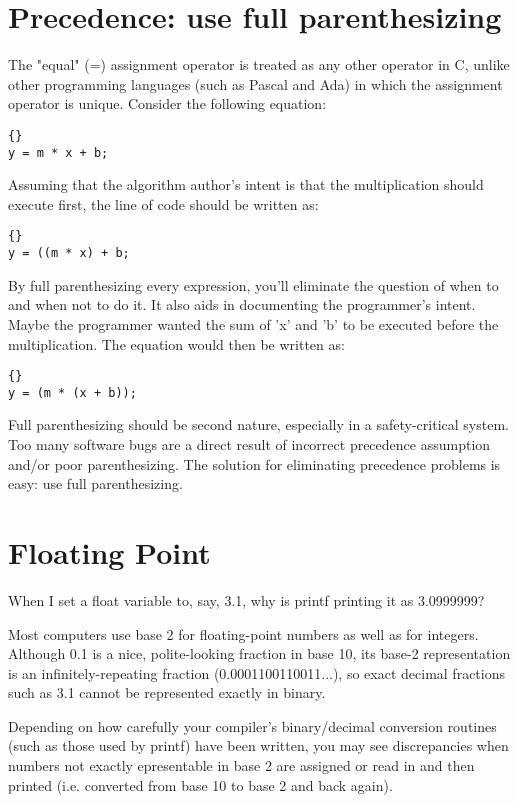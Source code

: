 \documentclass{report}
\begin{document}
\section{Precedence: use full parenthesizing}
The "equal" (=) assignment operator is treated as any other operator in C, unlike other programming languages (such as Pascal and Ada) in which the assignment operator is unique. 
Consider the following equation: 
\begin{lstlisting}{}
y = m * x + b;
\end{lstlisting}
Assuming that the algorithm author's intent is that the multiplication should execute first, the line of code should be written as: 
\begin{lstlisting}{}
y = ((m * x) + b;
\end{lstlisting}
By full parenthesizing every expression, you'll eliminate the question of when to and when not to do it. It also aids in documenting the programmer's intent. Maybe the programmer wanted the sum of 'x' and 'b' to be executed before the multiplication. The equation would then be written as: 
\begin{lstlisting}{}
y = (m * (x + b));
\end{lstlisting}
Full parenthesizing should be second nature, especially in a safety-critical system. Too many software bugs are a direct result of incorrect precedence assumption and/or poor parenthesizing. The solution for eliminating precedence problems is easy: use full parenthesizing. 


\section{Floating Point}
When I set a float variable to, say, 3.1, why is printf printing it as 3.0999999?

Most computers use base 2 for floating-point numbers as well as for integers. Although 0.1 is a nice, polite-looking fraction in base 10, its base-2 representation is an infinitely-repeating fraction (0.0001100110011...), so exact decimal fractions such as 3.1 cannot be represented exactly in binary.

Depending on how carefully your compiler's binary/decimal conversion routines (such as those used by printf) have been written, you may see discrepancies when numbers not exactly epresentable in base 2 are assigned or read in and then printed (i.e. converted from base 10 to base 2 and back again).
\end{document}
